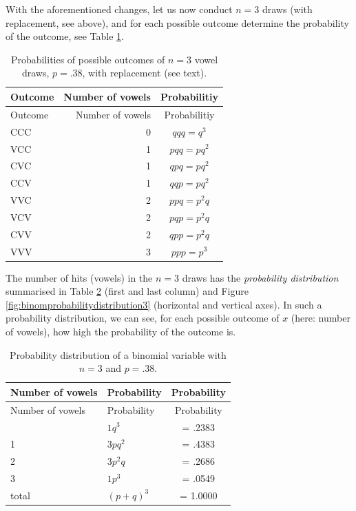 \documentclass[
]{book}
\begin{document}
With the aforementioned changes, let us now conduct \(n=3\) draws
(with replacement, see above), and for each possible outcome determine
the probability of the outcome, see
Table \ref{tab:vowelprobabilities}.

\begin{longtable}[]{@{}lrc@{}}
\caption{\label{tab:vowelprobabilities} Probabilities of possible outcomes of \(n=3\)
vowel draws, \(p=.38\), with replacement (see text).}\tabularnewline
\toprule\noalign{}
Outcome & Number of vowels & Probabilitiy \\
\midrule\noalign{}
\endfirsthead
\toprule\noalign{}
Outcome & Number of vowels & Probabilitiy \\
\midrule\noalign{}
\endhead
\bottomrule\noalign{}
\endlastfoot
CCC & 0 & \(qqq = q^3\) \\
VCC & 1 & \(pqq = pq^2\) \\
CVC & 1 & \(qpq = pq^2\) \\
CCV & 1 & \(qqp = pq^2\) \\
VVC & 2 & \(ppq = p^2q\) \\
VCV & 2 & \(pqp = p^2q\) \\
CVV & 2 & \(qpp = p^2q\) \\
VVV & 3 & \(ppp = p^3\) \\
\end{longtable}

The number of hits (vowels) in the \(n=3\) draws has the
\emph{probability distribution} summarised in
Table \ref{tab:binomprobabilitydistribution3} (first and last column) and
Figure \ref{fig:binomprobabilitydistribution3} (horizontal and vertical axes).
In such a probability distribution, we can see, for each possible outcome of \(x\)
(here: number of vowels), how high the probability of the outcome is.

\begin{longtable}[]{@{}llc@{}}
\caption{\label{tab:binomprobabilitydistribution3} Probability distribution of a
binomial variable with \(n=3\) and \(p=.38\).}\tabularnewline
\toprule\noalign{}
Number of vowels & Probability & Probability \\
\midrule\noalign{}
\endfirsthead
\toprule\noalign{}
Number of vowels & Probability & Probability \\
\midrule\noalign{}
\endhead
\bottomrule\noalign{}
\endlastfoot
0 & \(1 q^3\) & = .2383 \\
1 & \(3 p q^2\) & = .4383 \\
2 & \(3 p^2 q\) & = .2686 \\
3 & \(1 p^3\) & = .0549 \\
total & \((p+q)^3\) & = 1.0000 \\
\end{longtable}
\end{document}
